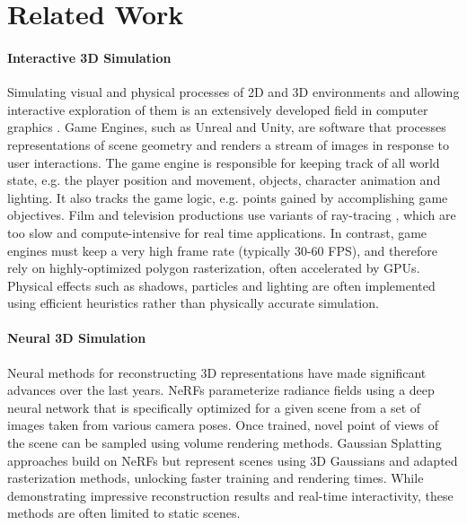 \documentclass{article} %
\begin{document}

\section{Related Work}
\label{related_work}


\paragraph{Interactive 3D Simulation}

Simulating visual and physical processes of 2D and 3D environments and allowing interactive exploration of them is an extensively developed field in computer graphics \citep{realtimerendering}. Game Engines, such as Unreal and Unity, are software that processes representations of scene geometry and renders a stream of images in response to user interactions. The game engine is responsible for keeping track of all world state, e.g. the player position and movement, objects, character animation and lighting. It also tracks the game logic, e.g. points gained by accomplishing game objectives. Film and television productions use variants of ray-tracing \citep{shirley2008realistic}, which are too slow and compute-intensive for real time applications. In contrast, game engines must keep a very high frame rate (typically 30-60 FPS), and therefore rely on highly-optimized polygon rasterization, often accelerated by GPUs. Physical effects such as shadows, particles and lighting are often implemented using efficient heuristics rather than physically accurate simulation.

\paragraph{Neural 3D Simulation}

Neural methods for reconstructing 3D representations have made significant advances over the last years. NeRFs \citep{mildenhall2020nerf}
parameterize radiance fields using a deep neural network that is specifically optimized for a given scene from a set of images taken from various camera poses. Once trained, novel point of views of the scene can be sampled using volume rendering methods. Gaussian Splatting \citep{kerbl3Dgaussians} approaches build on NeRFs but represent scenes using 3D Gaussians and adapted rasterization methods, unlocking faster training and rendering times. While demonstrating impressive reconstruction results and real-time interactivity, these methods are often limited to static scenes.
\end{document}
